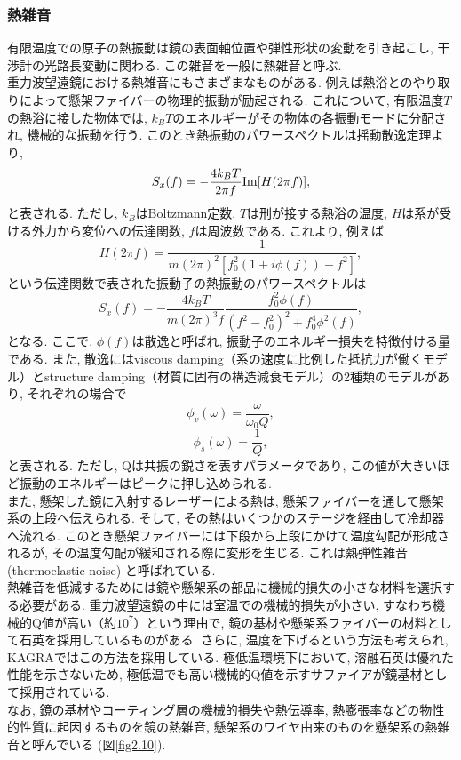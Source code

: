 \subsubsection{熱雑音}
\vskip3mm
有限温度での原子の熱振動は鏡の表面軸位置や弾性形状の変動を引き起こし, 干渉計の光路長変動に関わる. この雑音を一般に熱雑音と呼ぶ. \\
\quad 重力波望遠鏡における熱雑音にもさまざまなものがある. 例えば熱浴とのやり取りによって懸架ファイバーの物理的振動が励起される\cite{25}. これについて, 有限温度$T$の熱浴に接した物体では, $k_BT$のエネルギーがその物体の各振動モードに分配され, 機械的な振動を行う. このとき熱振動のパワースペクトルは揺動散逸定理\cite{26}より, 
\begin{equation}
S_x(f)=-\frac{4k_BT}{2\pi f}{\rm Im}[H(2\pi f)],
\end{equation}
と表される. ただし, $k_B$はBoltzmann定数, $T$は刑が接する熱浴の温度, $H$は系が受ける外力から変位への伝達関数, $f$は周波数である. これより, 例えば
\begin{equation}
H(2\pi f)=\frac{1}{m(2\pi)^2\left[f_0^2(1+i\phi(f))-f^2\right]},
\end{equation}
という伝達関数で表された振動子の熱振動のパワースペクトルは
\begin{equation}
S_x(f)=-\frac{4k_BT}{m(2\pi)^3f}\frac{f_0^2\phi(f)}{(f^2-f_0^2)^2+f_0^4\phi^2(f)},
\end{equation}
となる. ここで, $\phi(f)$は散逸と呼ばれ, 振動子のエネルギー損失を特徴付ける量である. また, 散逸にはviscous damping（系の速度に比例した抵抗力が働くモデル）とstructure damping（材質に固有の構造減衰モデル）の2種類のモデルがあり, それぞれの場合で
\begin{equation}
\phi_v(\omega)=\frac{\omega}{\omega_0Q},
\end{equation}
\begin{equation}
\phi_s(\omega)=\frac{1}{Q},
\end{equation}
と表される. ただし, Qは共振の鋭さを表すパラメータであり, この値が大きいほど振動のエネルギーはピークに押し込められる. \\
\quad また, 懸架した鏡に入射するレーザーによる熱は, 懸架ファイバーを通して懸架系の上段へ伝えられる. そして, その熱はいくつかのステージを経由して冷却器へ流れる. このとき懸架ファイバーには下段から上段にかけて温度勾配が形成されるが, その温度勾配が緩和される際に変形を生じる. これは熱弾性雑音 (thermoelastic noise) と呼ばれている\cite{27}. \\
\quad 熱雑音を低減するためには鏡や懸架系の部品に機械的損失の小さな材料を選択する必要がある. 重力波望遠鏡の中には室温での機械的損失が小さい, すなわち機械的Q値が高い（約$10^7$）という理由で, 鏡の基材や懸架系ファイバーの材料として石英を採用しているものがある\cite{LIGO}. さらに, 温度を下げるという方法も考えられ, KAGRAではこの方法を採用している. 極低温環境下において, 溶融石英は優れた性能を示さないため, 極低温でも高い機械的Q値を示すサファイアが鏡基材として採用されている\cite{KAGRA}. \\
\quad なお, 鏡の基材やコーティング層の機械的損失や熱伝導率, 熱膨張率などの物性的性質に起因するものを鏡の熱雑音, 懸架系のワイヤ由来のものを懸架系の熱雑音と呼んでいる (図\ref{fig2.10}). \\
